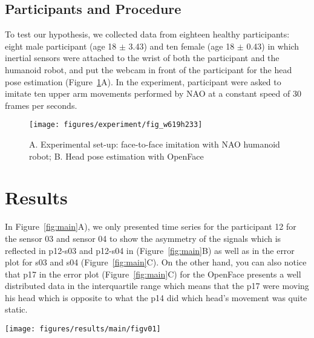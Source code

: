 \documentclass{sigchi}
\begin{document}
\subsection{Participants and Procedure}
To test our hypothesis, we collected data from eighteen healthy participants:
eight male participant (age 18 $\pm$ 3.43) and ten female (age 18 $\pm$ 0.43)
in which inertial sensors were attached to the wrist of both the participant and the
humanoid robot, and put the webcam in front of the participant for the head pose
estimation (Figure~\ref{fig:exp}A).
In the experiment, participant were asked to imitate ten upper arm movements
performed by NAO  at a constant speed of 30 frames per seconds.
\begin{figure}[!htb]
\centering
\texttt{[image: figures/experiment/fig\_w619h233]}
\caption[PA]{A. Experimental set-up: face-to-face imitation with NAO humanoid robot;
B. Head pose estimation with OpenFace \cite{Baltrusaitis2016} }
\label{fig:exp}
\end{figure}


\section{Results}
In Figure~\ref{fig:main}A), we only presented time series for the participant 12
for the sensor 03 and sensor 04 to show the asymmetry of the signals which is
reflected in p12-s03 and p12-s04 in (Figure~\ref{fig:main}B) as well as in the
error plot for s03 and s04 (Figure~\ref{fig:main}C). On the other hand,
you can also notice that p17 in the error plot (Figure~\ref{fig:main}C)
for the OpenFace presents a well distributed data in the interquartile range
which means that the p17 were moving his head which is opposite to what
the p14 did which head's movement was quite static.



\begin{figure*}[!htb]
\centering
\texttt{[image: figures/results/main/figv01]}
\caption[PA]{
A. Time series for the inertial sensors $a_x(n)$ and the
Head Pose Estimation in the $T_x$ axis;
B. State Space Reconstruction with $m=100$ and $\tau=4$ for
participants 17 and 16 for the head pose estimation and
participants 01 and 12 for sensor 03 and 04;
C. Error bars for the head pose estimation, sensor 03 and sensor 04 for
the eighteen participants.}
\label{fig:main}
\end{figure*}
\end{document}

